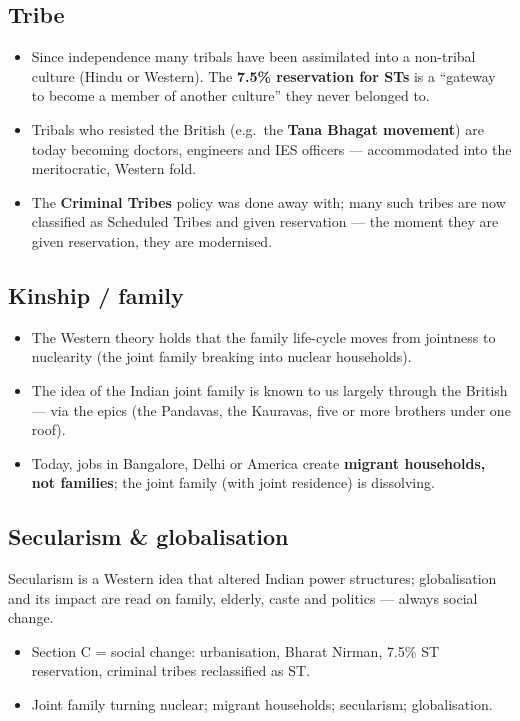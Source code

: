 \subsection{Tribe}

\begin{itemize}
\item Since independence many tribals have been assimilated into a non-tribal culture (Hindu or Western). The \textbf{7.5\% reservation for STs} is a ``gateway to become a member of another culture'' they never belonged to.
\item Tribals who resisted the British (e.g.\ the \textbf{Tana Bhagat movement}) are today becoming doctors, engineers and IES officers --- accommodated into the meritocratic, Western fold.
\item The \textbf{Criminal Tribes} policy was done away with; many such tribes are now classified as Scheduled Tribes and given reservation --- the moment they are given reservation, they are modernised.
\end{itemize}

\subsection{Kinship / family}

\begin{itemize}
\item The Western theory holds that the family life-cycle moves from jointness to nuclearity (the joint family breaking into nuclear households).
\item The idea of the Indian joint family is known to us largely through the British --- via the epics (the Pandavas, the Kauravas, five or more brothers under one roof).
\item Today, jobs in Bangalore, Delhi or America create \textbf{migrant households, not families}; the joint family (with joint residence) is dissolving.
\end{itemize}

\subsection{Secularism \& globalisation}

Secularism is a Western idea that altered Indian power structures; globalisation and its impact are read on family, elderly, caste and politics --- always social change.

\begin{QuickRevision}
\begin{itemize}
\item Section C = social change: urbanisation, Bharat Nirman, 7.5\% ST reservation, criminal tribes reclassified as ST.
\item Joint family turning nuclear; migrant households; secularism; globalisation.
\end{itemize}
\end{QuickRevision}

